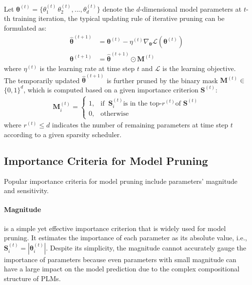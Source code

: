 Let $\bm{\theta}^{(t)}=\{\theta_1^{(t)}\,\theta_2^{(t)},...,\theta_d^{(t)}\}$ denote the $d$-dimensional model parameters at $t$-th training iteration, the typical updating rule of iterative pruning can be formulated as:
\begin{align}
	\hat{\bm{\theta}}^{(t+1)}&=\bm{\theta}^{(t)}-\eta^{(t)}\nabla_{\bm{\theta}} \mathcal{L}(\bm{\theta}^{(t)}) \\
	\bm{\theta}^{(t+1)} &= \hat{\bm{\theta}}^{(t+1)} \odot \bm{M}^{(t)}
	\label{eq:updaterule}
\end{align}
where $\eta^{(t)}$ is the learning rate at time step $t$ and $\mathcal{L}$ is the learning objective. The temporarily updated $\hat{\bm{\theta}}^{(t+1)}$ is further pruned by the binary mask $\bm{M}^{(t)}$$\in$ $\{0,1\}^{d}$, which is computed based on a given importance criterion $\bm{S}^{(t)}$:
\begin{align}
	\bm{M}^{(t)}_i=
	\begin{cases} 
		1, & \text{if }~\bm{S}^{(t)}_i\text{is in the top-}r^{(t)}\text{of }\bm{S}^{(t)}\\
		0,  & \text{otherwise}  
	\end{cases}
\label{eq:mask}
\end{align}
where $r^{(t)}$$\leq d$ indicates the number of remaining parameters at time step $t$ according to a given sparsity scheduler.
\subsection{Importance Criteria for Model Pruning}
Popular importance criteria for model pruning include parameters' magnitude and sensitivity.
\paragraph{Magnitude} is a simple yet effective importance criterion that is widely used for model pruning. It estimates the importance of each parameter as its absolute value, i.e., $\bm{S}^{(t)}_i=|\bm{\theta}^{(t)}_i|$. Despite its simplicity, the magnitude cannot accurately gauge the importance of parameters because even parameters with small magnitude can have a large impact on the model prediction due to the complex compositional structure of PLMs.

